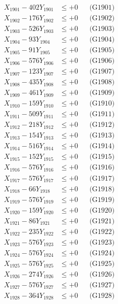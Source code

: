 \documentclass[a4paper,10pt]{article}
\begin{document}
{\begin{align}
\allowbreak
X_{1901} - 402Y_{1901} &\leq +0 && \text{(G1901)} \\
X_{1902} - 176Y_{1902} &\leq +0 && \text{(G1902)} \\
X_{1903} - 526Y_{1903} &\leq +0 && \text{(G1903)} \\
X_{1904} - 93Y_{1904} &\leq +0 && \text{(G1904)} \\
X_{1905} - 91Y_{1905} &\leq +0 && \text{(G1905)} \\
X_{1906} - 576Y_{1906} &\leq +0 && \text{(G1906)} \\
X_{1907} - 123Y_{1907} &\leq +0 && \text{(G1907)} \\
X_{1908} - 435Y_{1908} &\leq +0 && \text{(G1908)} \\
X_{1909} - 461Y_{1909} &\leq +0 && \text{(G1909)} \\
X_{1910} - 159Y_{1910} &\leq +0 && \text{(G1910)} \\
\allowbreak
X_{1911} - 509Y_{1911} &\leq +0 && \text{(G1911)} \\
X_{1912} - 218Y_{1912} &\leq +0 && \text{(G1912)} \\
X_{1913} - 154Y_{1913} &\leq +0 && \text{(G1913)} \\
X_{1914} - 516Y_{1914} &\leq +0 && \text{(G1914)} \\
X_{1915} - 152Y_{1915} &\leq +0 && \text{(G1915)} \\
X_{1916} - 576Y_{1916} &\leq +0 && \text{(G1916)} \\
X_{1917} - 576Y_{1917} &\leq +0 && \text{(G1917)} \\
X_{1918} - 66Y_{1918} &\leq +0 && \text{(G1918)} \\
X_{1919} - 576Y_{1919} &\leq +0 && \text{(G1919)} \\
X_{1920} - 159Y_{1920} &\leq +0 && \text{(G1920)} \\
\allowbreak
X_{1921} - 86Y_{1921} &\leq +0 && \text{(G1921)} \\
X_{1922} - 235Y_{1922} &\leq +0 && \text{(G1922)} \\
X_{1923} - 576Y_{1923} &\leq +0 && \text{(G1923)} \\
X_{1924} - 576Y_{1924} &\leq +0 && \text{(G1924)} \\
X_{1925} - 576Y_{1925} &\leq +0 && \text{(G1925)} \\
X_{1926} - 274Y_{1926} &\leq +0 && \text{(G1926)} \\
X_{1927} - 576Y_{1927} &\leq +0 && \text{(G1927)} \\
X_{1928} - 364Y_{1928} &\leq +0 && \text{(G1928)} \\

\end{align}}
\end{document}
